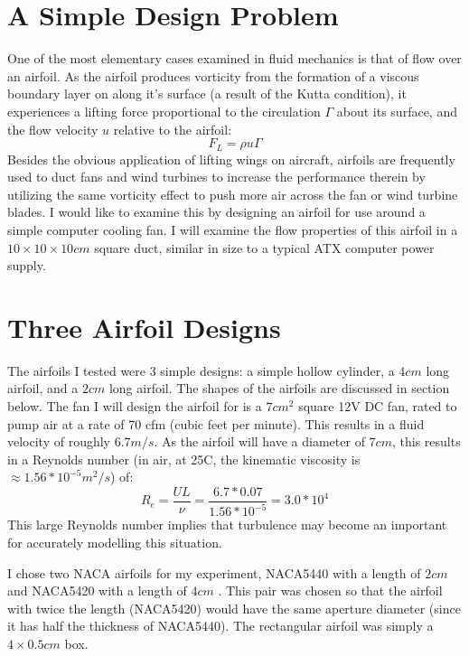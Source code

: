 \documentclass[12pt]{article}
\begin{document}
\section{A Simple Design Problem}
One of the most elementary cases examined in fluid mechanics is that of flow 
over an airfoil.  As the airfoil produces vorticity from the formation of a
viscous boundary layer on along it's surface (a result of the Kutta condition),
it experiences a lifting force proportional to the circulation $\Gamma$ about
its surface, and the flow velocity $u$ relative to the airfoil:
$$F_L = \rho u \Gamma$$
Besides the obvious application of lifting wings on aircraft, airfoils are 
frequently used to duct fans and wind turbines to increase the performance
therein by utilizing the same vorticity effect to push more air across the fan
or wind turbine blades.  I would like to examine this by designing an airfoil
for use around a simple computer cooling fan.  I will examine the flow 
properties of this airfoil in a $10\times10\times10cm$ square duct, similar in
size to a typical ATX computer power supply.

\section{Three Airfoil Designs}
The airfoils I tested were 3 simple designs: a simple hollow cylinder, a $4cm$ long airfoil, and a $2cm$ long airfoil.  The shapes of the
airfoils are discussed in section below.
The fan I will design the airfoil for is a $7cm^2$ square 12V DC fan, rated to 
pump air at a rate of 70 cfm (cubic feet per minute).  This results in a fluid
velocity of roughly $6.7m/s$.  As the airfoil will have a diameter of $7cm$, 
this results in a Reynolds number (in air, at 25\degree C, the kinematic viscosity is 
$\approx1.56*10^{-5} m^2/s$) of:
$$R_e = \frac{UL}{\nu} = \frac{6.7*0.07}{1.56*10^{-5}} = 3.0*10^4$$
This large Reynolds number implies that turbulence may become an important for
accurately modelling this situation.

I chose two NACA airfoils for my experiment, NACA5440 with a length of $2cm$
and NACA5420 with a length of $4cm$ .  This pair was chosen so that the airfoil
with twice the length (NACA5420) would have the same aperture diameter (since it has half the thickness of NACA5440).  The rectangular airfoil was simply a $4
\times 0.5cm$ box.
\end{document}
